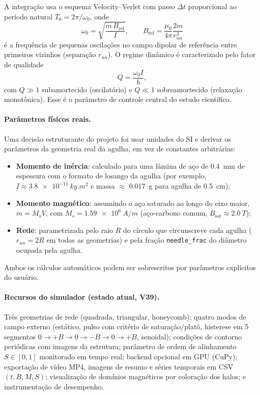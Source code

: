 \documentclass[11pt,a4paper]{article}
\newcommand{\code}[1]{\texttt{#1}}
\begin{document}
A integração usa o esquema Velocity--Verlet com passo $\Delta t$
proporcional ao período natural $T_0 = 2\pi/\omega_0$, onde
\begin{equation}
\omega_0 = \sqrt{\frac{m\,B_{\mathrm{ref}}}{I}},
\qquad
B_{\mathrm{ref}} = \frac{\mu_0}{4\pi}\frac{2m}{r_{nn}^{3}}
\end{equation}
é a frequência de pequenas oscilações no campo dipolar de referência
entre primeiros vizinhos (separação $r_{nn}$). O regime dinâmico é
caracterizado pelo fator de qualidade
\begin{equation}
Q = \frac{\omega_0 I}{b},
\end{equation}
com $Q \gg 1$ subamortecido (oscilatório) e $Q \ll 1$ sobreamortecido
(relaxação monotônica). Esse é o parâmetro de controle central do estudo
científico.

\paragraph{Parâmetros físicos reais.}
Uma decisão estruturante do projeto foi usar unidades do SI e derivar os
parâmetros da geometria real da agulha, em vez de constantes arbitrárias:
\begin{itemize}
\item \textbf{Momento de inércia}: calculado para uma lâmina de aço de
\SI{0.4}{mm} de espessura com o formato de losango da agulha (por
exemplo, $I \approx \SI{3.8e-11}{kg.m^2}$ e massa $\approx$
\SI{0.017}{g} para agulha de \SI{0.5}{cm});
\item \textbf{Momento magnético}: assumindo o aço saturado ao longo do
eixo maior, $m = M_s V$, com $M_s = \SI{1.59e6}{A/m}$ (aço-carbono
comum, $B_{\mathrm{sat}} \approx \SI{2.0}{T}$);
\item \textbf{Rede}: parametrizada pelo raio $R$ do círculo que
circunscreve cada agulha ($r_{nn} = 2R$ em todas as geometrias) e pela
fração \code{needle\_frac} do diâmetro ocupada pela agulha.
\end{itemize}
Ambos os cálculos automáticos podem ser sobrescritos por parâmetros
explícitos do usuário.

\paragraph{Recursos do simulador (estado atual, V39).}
Três geometrias de rede (quadrada, triangular, honeycomb); quatro modos
de campo externo (estático, pulso com critério de saturação/platô,
histerese em 5 segmentos $0 \to +B \to 0 \to -B \to 0 \to +B$, senoidal);
condições de contorno periódicas com imagens da estrutura; parâmetro de
ordem de alinhamento $S \in [0,1]$ monitorado em tempo real; backend
opcional em GPU (CuPy); exportação de vídeo MP4, imagens de resumo e
séries temporais em CSV $(t, B, M, S)$; visualização de domínios
magnéticos por coloração dos halos; e instrumentação de desempenho.
\end{document}
